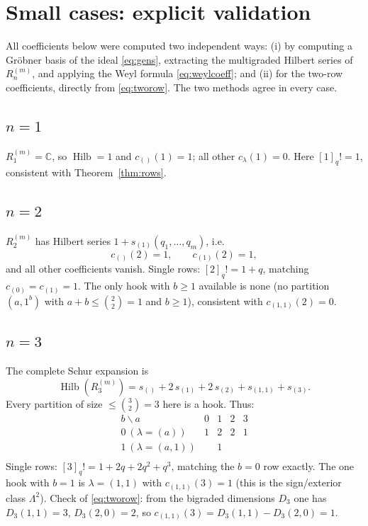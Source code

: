 \documentclass[11pt]{article}
\theoremstyle{definition}
\theoremstyle{remark}
\newcommand{\Hilb}{\operatorname{Hilb}}
\newcommand{\CC}{\mathbb{C}}
\begin{document}
\section{Small cases: explicit validation}\label{sec:tests}

All coefficients below were computed two independent ways: (i) by computing a Gr\"obner basis
of the ideal \eqref{eq:gens}, extracting the multigraded Hilbert series of $R_n^{(m)}$, and
applying the Weyl formula \eqref{eq:weylcoeff}; and (ii) for the two-row coefficients, directly
from \eqref{eq:tworow}.  The two methods agree in every case.

\subsection*{$n=1$}
$R_1^{(m)}=\CC$, so $\Hilb=1$ and $c_{()}(1)=1$; all other $c_\lambda(1)=0$.
Here $[1]_q!=1$, consistent with Theorem~\ref{thm:rows}.

\subsection*{$n=2$}
$R_2^{(m)}$ has Hilbert series $1+s_{(1)}(q_1,\dots,q_m)$, i.e.
\[
c_{()}(2)=1,\qquad c_{(1)}(2)=1,
\]
and all other coefficients vanish.  Single rows: $[2]_q!=1+q$, matching $c_{(0)}=c_{(1)}=1$.
The only hook with $b\ge1$ available is none (no partition $(a,1^b)$ with $a+b\le\binom{2}{2}=1$
and $b\ge1$), consistent with $c_{(1,1)}(2)=0$.

\subsection*{$n=3$}
The complete Schur expansion is
\[
\Hilb(R_3^{(m)})=s_{()}+2\,s_{(1)}+2\,s_{(2)}+s_{(1,1)}+s_{(3)} .
\]
Every partition of size $\le\binom32=3$ here is a hook.  Thus:
\[
\begin{array}{c|cccc}
b\backslash a & 0 & 1 & 2 & 3\\\hline
0\ (\lambda=(a)) & 1 & 2 & 2 & 1\\
1\ (\lambda=(a,1)) &  & 1 &  & \\
\end{array}
\]
Single rows: $[3]_q!=1+2q+2q^2+q^3$, matching the $b=0$ row exactly.  The one hook with $b=1$
is $\lambda=(1,1)$ with $c_{(1,1)}(3)=1$ (this is the sign/exterior class $\Lambda^2$).
Check of \eqref{eq:tworow}: from the bigraded dimensions $D_3$ one has
$D_3(1,1)=3$, $D_3(2,0)=2$, so $c_{(1,1)}(3)=D_3(1,1)-D_3(2,0)=1$. \checkmark
\end{document}
